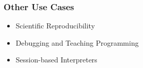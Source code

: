 \begin{frame}[fragile]
  \frametitle{Other Use Cases}
  \newcommand{\file}[2]{%
        \begin{tikzpicture}
            \begin{scope}[>=stealth]
                \node (center) at (0,0){};
                \draw[color=#2] (center) -- ++(0,1) -- ++(0.6,0) -- ++(0.2,-0.2) -- ++(0,-0.8) -- (center);
                \coordinate (s) at ($(center) + (0,1) + (0.6,0)$);
                \coordinate (c) at ($(center) + (0.4,0.4)$);
                \draw[color=#2] (s) -- ++(0,-0.2) -- ++(0.2,0);
                \node (text) at (0,0) [fill=white] {\color{#2}#1};
            \end{scope}
        \end{tikzpicture}
    }

  \begin{itemize}
    \item Scientific Reproducibility

    \pause
    \item Debugging and Teaching Programming
    \pause
    \item Session-based Interpreters
  \end{itemize}

\end{frame}